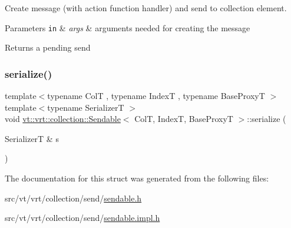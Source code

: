 Create message (with action function handler) and send to collection element. 


\begin{DoxyParams}[1]{Parameters}
\mbox{\tt in}  & {\em args} & arguments needed for creating the message\\
\hline
\end{DoxyParams}
\begin{DoxyReturn}{Returns}
a pending send 
\end{DoxyReturn}
\mbox{\label{structvt_1_1vrt_1_1collection_1_1_sendable_ae8e7cff31e30aa7cda6b958c1a81ddc3}} 
\subsubsection{\texorpdfstring{serialize()}{serialize()}}
{\footnotesize\ttfamily template$<$typename ColT , typename IndexT , typename Base\+ProxyT $>$ \\
template$<$typename SerializerT $>$ \\
void \hyperlink{structvt_1_1vrt_1_1collection_1_1_sendable}{vt\+::vrt\+::collection\+::\+Sendable}$<$ ColT, IndexT, Base\+ProxyT $>$\+::serialize (\begin{DoxyParamCaption}\item[{SerializerT \&}]{s }\end{DoxyParamCaption})}



The documentation for this struct was generated from the following files\+:\begin{DoxyCompactItemize}
\item 
src/vt/vrt/collection/send/\hyperlink{sendable_8h}{sendable.\+h}\item 
src/vt/vrt/collection/send/\hyperlink{sendable_8impl_8h}{sendable.\+impl.\+h}\end{DoxyCompactItemize}
